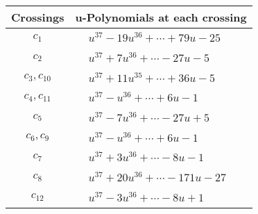 \documentclass[1p]{elsarticle_modified}
\theoremstyle{definition}
\begin{document}
\begin{tabular}{m{50pt}|m{274pt}}
Crossings & \hspace{64pt}u-Polynomials at each crossing \\
\hline $$\begin{aligned}c_{1}\end{aligned}$$&$\begin{aligned}
&u^{37}-19 u^{36}+\cdots+79 u-25
\end{aligned}$\\
\hline $$\begin{aligned}c_{2}\end{aligned}$$&$\begin{aligned}
&u^{37}+7 u^{36}+\cdots-27 u-5
\end{aligned}$\\
\hline $$\begin{aligned}c_{3},c_{10}\end{aligned}$$&$\begin{aligned}
&u^{37}+11 u^{35}+\cdots+36 u-5
\end{aligned}$\\
\hline $$\begin{aligned}c_{4},c_{11}\end{aligned}$$&$\begin{aligned}
&u^{37}- u^{36}+\cdots+6 u-1
\end{aligned}$\\
\hline $$\begin{aligned}c_{5}\end{aligned}$$&$\begin{aligned}
&u^{37}-7 u^{36}+\cdots-27 u+5
\end{aligned}$\\
\hline $$\begin{aligned}c_{6},c_{9}\end{aligned}$$&$\begin{aligned}
&u^{37}- u^{36}+\cdots+6 u-1
\end{aligned}$\\
\hline $$\begin{aligned}c_{7}\end{aligned}$$&$\begin{aligned}
&u^{37}+3 u^{36}+\cdots-8 u-1
\end{aligned}$\\
\hline $$\begin{aligned}c_{8}\end{aligned}$$&$\begin{aligned}
&u^{37}+20 u^{36}+\cdots-171 u-27
\end{aligned}$\\
\hline $$\begin{aligned}c_{12}\end{aligned}$$&$\begin{aligned}
&u^{37}-3 u^{36}+\cdots-8 u+1
\end{aligned}$\\
\hline
\end{tabular}\\~\\
\end{document}
